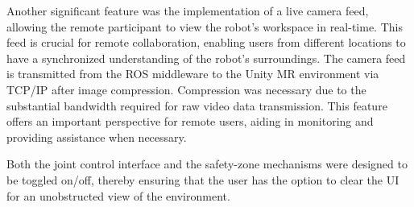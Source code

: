 Another significant feature was the implementation of a live camera feed, allowing the remote participant to view the robot’s workspace in real-time. This feed is crucial for remote collaboration, enabling users from different locations to have a synchronized understanding of the robot’s surroundings. The camera feed is transmitted from the \ac{ROS} middleware to the Unity \ac{MR} environment via \ac{TCP}/\ac{IP} after image compression. Compression was necessary due to the substantial bandwidth required for raw video data transmission. This feature offers an important perspective for remote users, aiding in monitoring and providing assistance when necessary.

Both the joint control interface and the safety-zone mechanisms were designed to be toggled on/off, thereby ensuring that the user has the option to clear the \ac{UI} for an unobstructed view of the environment.

